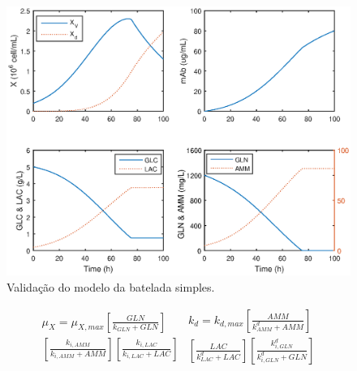 \documentclass[fleqn,10pt]{SelfArx} %
\begin{document}
\begin{figure}[ht]\centering
	\includegraphics[width=\linewidth]{model1_validation}
	\caption{Validação do modelo da batelada simples.}
	\label{fig:model1_validation}
\end{figure}

\begin{subequations}  \label{eq:algebric}
\begin{multline} \label{eq:algebrica}
	\mu _X = \mu _{X,max}\left[\frac{GLN}{k_{GLN} + GLN}\right] \\ \left[\frac{k_{i,AMM}}{k_{i,AMM}+AMM}\right] \left[\frac{k_{i,LAC}}{k_{i,LAC} + LAC}\right]
\end{multline}
\begin{multline} \label{eq:algebricb}
	k_d=k_{d,max} \left[\frac{AMM}{k_{AMM}^d+AMM}\right] \\ \left[\frac{LAC}{k_{LAC}^d+LAC}\right] \left[\frac{k_{i,GLN}^d}{k_{i,GLN}^d + GLN}\right]
\end{multline}
\end{subequations}
\end{document}
